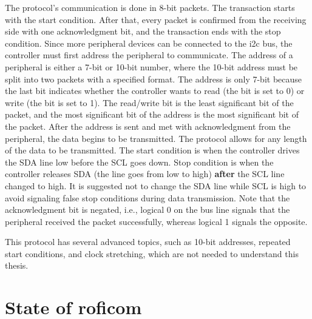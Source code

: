 \documentclass[
  digital,     %
  oneside,     %
  nosansbold,  %
  nocolorbold, %
  nolof,         %
  nolot,         %
]{fithesis4}
\begin{document}
The protocol's communication is done in 8-bit packets. The transaction starts with the start condition. After that, every packet is confirmed from the receiving side with one acknowledgment bit, and the transaction ends with the stop condition. Since more peripheral devices can be connected to the \acrshort{i2c} bus, the controller must first address the peripheral to communicate.
The address of a peripheral is either a 7-bit or 10-bit number, where the 10-bit address must be split into two packets with a specified format. The address is only 7-bit because the last bit indicates whether the controller wants to read (the bit is set to 0) or write (the bit is set to 1). The read/write bit is the least significant bit of the packet, and the most significant bit of the address is the most significant bit of the packet. After the address is sent and met with acknowledgment from the peripheral, the data begins to be transmitted. The protocol allows for any length of the data to be transmitted. 
The start condition is when the controller drives the SDA line low before the SCL goes down. Stop condition is when the controller releases SDA (the line goes from low to high) \textbf{after} the SCL line changed to high. It is suggested not to change the SDA line while SCL is high to avoid signaling false stop conditions during data transmission. Note that the acknowledgment bit is negated, i.e., logical 0 on the bus line signals that the peripheral received the packet successfully, whereas logical 1 signals the opposite.

This protocol has several advanced topics, such as 10-bit addresses, repeated start conditions, and clock stretching, which are not needed to understand this thesis.

\chapter[ State of RoFICoM ]{ State of \acrshort{roficom} }
\end{document}
